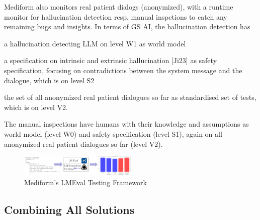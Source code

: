 \documentclass[twocolumn]{article}
\begin{document}
Mediform also monitors real patient dialogs (anonymized), with a runtime monitor for hallucination detection resp. manual inspetions to catch any remaining bugs and insights.
In terms of GS AI, the hallucination detection has
\begin{compactitem}
\item a hallucination detecting LLM on level W1 as world model
\item a specification on intrinsic and extrinsic hallucination [Ji23] as safety specification, focusing on contradictions between the system message and the dialogue, which is on level S2
\item the set of all anonymized real patient dialogues so far as standardised set of tests, which is on level V2.
\end{compactitem}
The manual inspections have humans with their knowledge and assumptions as world model (level W0) and safety specification (level S1), again on all anonymized real patient dialogues so far (level V2).

\begin{figure}[hbt!]
  \begin{center}
\includegraphics[width=0.5\textwidth]{figures/LMEval2}
  \vspace{-8mm}
\caption{Mediform’s LMEval Testing Framework}
\label{fig:lmeval}
\end{center}
\end{figure}

\subsection{Combining All Solutions}
\end{document}
